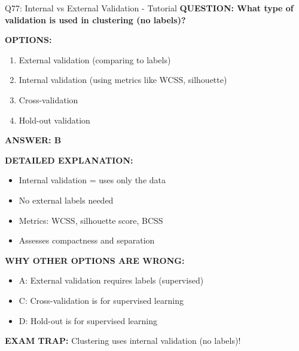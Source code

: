 \documentclass[8pt]{beamer}
\begin{document}
	\begin{frame}{Q77: Internal vs External Validation - Tutorial}
		\fontsize{6.5}{7.5}\selectfont
		\textbf{QUESTION: What type of validation is used in clustering (no labels)?}
		
		\vspace{0.1cm}
		\textbf{OPTIONS:}
		\begin{enumerate}
			\item External validation (comparing to labels)
			\item Internal validation (using metrics like WCSS, silhouette)
			\item Cross-validation
			\item Hold-out validation
		\end{enumerate}
		
		\vspace{0.1cm}
		\textcolor{myblue}{\textbf{ANSWER: B}}
		
		\vspace{0.1cm}
		\textbf{DETAILED EXPLANATION:}
		\begin{itemize}
			\item Internal validation = uses only the data
			\item No external labels needed
			\item Metrics: WCSS, silhouette score, BCSS
			\item Assesses compactness and separation
		\end{itemize}
		
		\vspace{0.1cm}
		\textcolor{myred}{\textbf{WHY OTHER OPTIONS ARE WRONG:}}
		\begin{itemize}
			\item \textcolor{myred}{A:} External validation requires labels (supervised)
			\item \textcolor{myred}{C:} Cross-validation is for supervised learning
			\item \textcolor{myred}{D:} Hold-out is for supervised learning
		\end{itemize}
		
		\textcolor{myred}{\textbf{EXAM TRAP:}} Clustering uses \textcolor{myblue}{internal validation} (no labels)!
	\end{frame}
	
\end{document}
